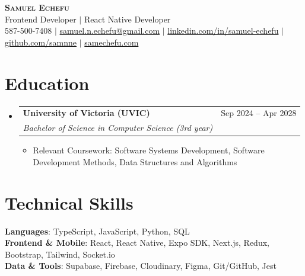 \documentclass[letterpaper,10pt]{article}
\makeatletter
\newcommand{\resumeItem}[1]{
  \item\small{
    {#1 \vspace{-1pt}}
  }
}
\newcommand{\resumeSubheading}[4]{
  \vspace{-2pt}\item
    \begin{tabular*}{0.97\textwidth}[t]{l@{\extracolsep{\fill}}r}
      \textbf{#1} & #2 \\
      \textit{\small#3} & \textit{\small #4} \\
    \end{tabular*}\vspace{-6pt}
}
\newcommand{\resumeSubHeadingListStart}{\begin{itemize}[leftmargin=0.15in, label={}]}
\newcommand{\resumeSubHeadingListEnd}{\end{itemize}}
\newcommand{\resumeItemListStart}{\begin{itemize}[label=$\bullet$, itemsep=1.80pt, topsep=0pt, parsep=0pt]}
\newcommand{\resumeItemListEnd}{\end{itemize}\vspace{-2pt}}
\makeatother
\begin{document}
\begin{center}
    \textbf{\Huge \scshape Samuel Echefu} \\ \vspace{3pt}
    \small Frontend Developer $|$ React Native Developer \\ \vspace{3pt}
    \small 587-500-7408 $|$ \href{mailto:samuel.n.echefu@gmail.com}{samuel.n.echefu@gmail.com} $|$ 
    \href{https://linkedin.com/in/samuel-echefu-251a21336}{linkedin.com/in/samuel-echefu} $|$
    \href{https://github.com/samnne}{github.com/samnne} $|$
    \href{https://samechefu.com}{samechefu.com}
\end{center}


\section{Education}
\resumeSubHeadingListStart
\resumeSubheading{University of Victoria (UVIC)}{Sep 2024 -- Apr 2028}{Bachelor of Science in Computer Science (3rd year)}{}
\resumeItemListStart
  \resumeItem{Relevant Coursework: Software Systems Development, Software Development Methods, Data Structures and Algorithms}
\resumeItemListEnd
\resumeSubHeadingListEnd

\section{Technical Skills}
 \begin{itemize}[leftmargin=0.15in, label={}]
    \small{\item{
     \textbf{Languages}{: TypeScript, JavaScript, Python, SQL} \\ \vspace{0pt}
     \textbf{Frontend \& Mobile}{: React, React Native, Expo SDK, Next.js, Redux, Bootstrap, Tailwind, Socket.io} \\ \vspace{0pt}
     \textbf{Data \& Tools}{: Supabase, Firebase, Cloudinary, Figma, Git/GitHub, Jest}
    }}
 \end{itemize}
\end{document}
